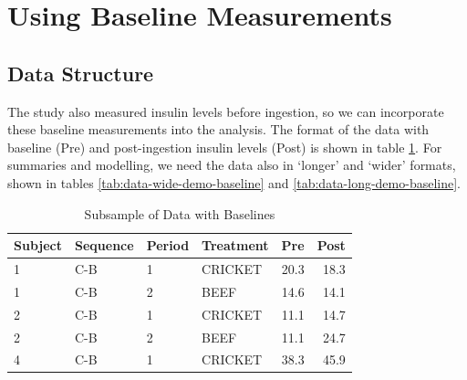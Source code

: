 \section{Using Baseline Measurements}\label{using-baseline-measurements}

\subsection{Data Structure}\label{data-structure-1}

The study also measured insulin levels before ingestion, so we can
incorporate these baseline measurements into the analysis. The format of
the data with baseline (Pre) and post-ingestion insulin levels (Post) is
shown in table \ref{tab:data-demo-baseline}. For summaries and
modelling, we need the data also in `longer' and `wider' formats, shown
in tables \ref{tab:data-wide-demo-baseline} and
\ref{tab:data-long-demo-baseline}.

\begin{table}

\caption{\label{tab:data-demo-baseline}Subsample of Data with Baselines}
\centering
\begin{tabular}[t]{llllrr}
\toprule
Subject & Sequence & Period & Treatment & Pre & Post\\
\midrule
1 & C-B & 1 & CRICKET & 20.3 & 18.3\\
1 & C-B & 2 & BEEF & 14.6 & 14.1\\
2 & C-B & 1 & CRICKET & 11.1 & 14.7\\
2 & C-B & 2 & BEEF & 11.1 & 24.7\\
4 & C-B & 1 & CRICKET & 38.3 & 45.9\\
\bottomrule
\end{tabular}
\end{table}

\begin{Shaded}
\begin{Highlighting}[]
\OtherTok{\textless{}{-}}\SpecialCharTok{\%\textgreater{}\%}
  \NormalTok{(} 
                \NormalTok{,}
                \NormalTok{,}

\OtherTok{\textless{}{-}}\SpecialCharTok{\%\textgreater{}\%}
  \NormalTok{(} 
               \SpecialCharTok{\%\textgreater{}\%}
   \NormalTok{)}
\end{Highlighting}
\end{Shaded}


